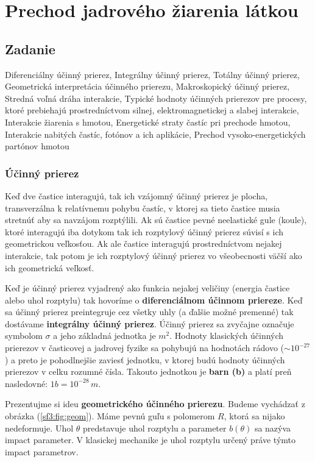 \documentclass[../../main.tex]{subfiles}
\begin{document}
\chapter{Prechod jadrového žiarenia látkou}

\section{Zadanie}

Diferenciálny účinný prierez, Integrálny účinný prierez, Totálny účinný prierez, Geometrická interpretácia účinného prierezu, Makroskopický účinný prierez, Stredná voľná dráha interakcie, Typické hodnoty účinných prierezov pre procesy, ktoré prebiehajú prostredníctvom silnej, elektromagnetickej a slabej interakcie, Interakcie žiarenia s hmotou, Energetické straty častíc pri prechode hmotou, Interakcie nabitých častíc, fotónov a ich aplikácie, Prechod vysoko-energetických partónov hmotou

\subsection{Účinný prierez}
Keď dve častice interagujú, tak ich vzájomný účinný prierez je plocha, transverzálna k relatívnemu pohybu častíc, v ktorej sa tieto častice musia stretnúť aby sa navzájom rozptýlili. Ak sú častice pevné neelastické gule (koule), ktoré interagujú iba dotykom tak ich rozptylový účinný prierez súvisí s ich geometrickou veľkosťou. Ak ale častice interagujú prostredníctvom nejakej interakcie, tak potom je ich rozptylový účinný prierez vo všeobecnosti väčší ako ich geometrická veľkosť. 

Keď je účinný prierez vyjadrený ako funkcia nejakej veličiny (energia častice alebo uhol rozptylu) tak hovoríme o \textbf{diferenciálnom účinnom priereze}. Keď sa účinný prierez preintegruje cez všetky uhly (a ďalšie možné premenné) tak dostávame \textbf{integrálny účinný prierez}. Účinný prierez sa zvyčajne označuje symbolom $\sigma$ a jeho základná jednotka je $m^2$. Hodnoty klasických účinných prierezov v časticovej a jadrovej fyzike sa pohybujú na hodnotách rádovo ($\sim 10^{-27}$) a preto je pohodlnejšie zaviesť jednotku, v ktorej budú hodnoty účinných prierezov v celku rozumné čísla. Takouto jednotkou je \textbf{barn (b)} a platí preň nasledovné: $1b = 10^{-28}\,m$. 

Prezentujme si ideu \textbf{geometrického účinného prierezu}. Budeme vychádzať z obrázka (\ref{sf3:fig:geom}). Máme pevnú guľu s polomerom $R$, ktorá sa nijako nedeformuje. Uhol $\theta$ predstavuje uhol rozptylu a  parameter $b(\theta)$ sa nazýva impact parameter. V klasickej mechanike je uhol rozptylu určený práve týmto impact parametrov.
\end{document}
